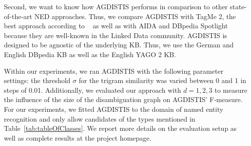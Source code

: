 
Second, we want to know how AGDISTIS performs in comparison to other state-of-the-art \ac{NED} approaches. 
Thus, we compare AGDISTIS with TagMe 2, the best approach according to ~\cite{cornolti} as well as with AIDA and DBpedia Spotlight because they are well-known in the Linked Data community. 
AGDISTIS is designed to be agnostic of the underlying \ac{KB}.
Thus, we use the German and English DBpedia \ac{KB} as well as the English YAGO 2 \ac{KB}. %

Within our experiments, we ran AGDISTIS with the following parameter settings: 
the threshold $\sigma$ for the trigram similarity was varied between 0 and 1 in steps of 0.01. 
Additionally, we evaluated our approach with $d=1,2,3$ to measure the influence of the size of the disambiguation graph on AGDISTIS' F-measure.
For our experiments, we fitted AGDISTIS to the domain of named entity recognition and only allow candidates of the types mentioned in Table~\ref{tab:tableOfClasses}.
We report more details on the evaluation setup as well as complete results at the project homepage.

